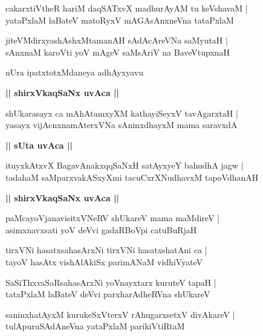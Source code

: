 \documentclass[twoside,12pt,openright]{book}
\newcounter{shloka}[chapter]
\def\uvaca#1{\centerline{{\large\textbf{#1}}}}
\begin{document}
\begin{shloka}%
cakarxtiVtheR hariM daqSATxvX madhurAyAM tu keVshavaM |\\
yataPxlaM laBateV matoRyxV mAGAsAnxneVna tataPxlaM 
\end{shloka}

\begin{shloka}%
jiteVMdirxyashAshxMtamanAH sAdAcAreVNa saMyutaH |\\
sAnxnaM karoVti yoV mAgeV saMsAriV na BaveVtupxnaH 
\end{shloka}

\begin{center}
nUra ipatxtotxMdaneya adhAyxyavu 
\end{center}

\uvaca{|| shirxVkaqSaNx uvAca ||}

\begin{shloka}%
shUkarasayx ca mAhAtamxyXM kathayiSeyxV tavAgarxtaH |\\
yasayx vijAcnxnamAterxVNa sAninxdhayxM mama saravxdA 
\end{shloka}

\uvaca{|| sUta uvAca ||}

\begin{shloka}%
ituyxkAtxvX BagavAnakxqqSaNxH satAyxyeY bahudhA jagw |\\
tadahaM saMparxvakASxyXmi tacuCxrXNudhavxM tapoVdhanAH 
\end{shloka}

\uvaca{|| shirxVkaqSaNx uvAca ||}

\begin{shloka}%
paMcayoVjanavisitxVNeRV shUkareV mama maMdireV |\\
asimxnavxsati yoV deVvi gadaRBoVpi catuBuRjaH 
\end{shloka}

\begin{shloka}%
tirxVNi hasatxsahasArxNi tirxVNi hasatxshatAni ca |\\
tayoV hasAtx vishAlAkiSx parimANaM vidhiVyateV
\end{shloka}

\begin{shloka}%
SaSiThxvaSaRsahasArxNi yoVnayxtarx kuruteV tapaH |\\
tataPxlaM laBateV deVvi parxharAdheRVna shUkareV 
\end{shloka}

\begin{shloka}%
saninxhatAyxM kurukeSxVterxV rAhugarxsetxV divAkareV |\\
tulApuruSAdAneVna yataPxlaM parikiVtiRtaM 
\end{shloka}
\end{document}
